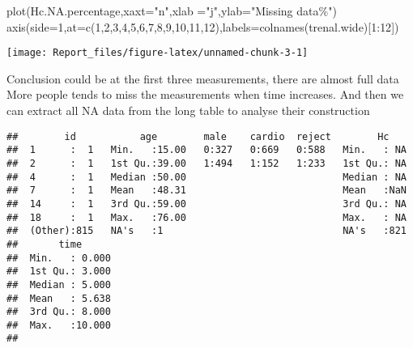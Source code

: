 \documentclass[
]{article}
\newenvironment{Shaded}{\begin{snugshade}}{\end{snugshade}}
\newcommand{\AttributeTok}[1]{\textcolor[rgb]{0.77,0.63,0.00}{#1}}
\newcommand{\CommentTok}[1]{\textcolor[rgb]{0.56,0.35,0.01}{\textit{#1}}}
\newcommand{\DecValTok}[1]{\textcolor[rgb]{0.00,0.00,0.81}{#1}}
\newcommand{\FunctionTok}[1]{\textcolor[rgb]{0.00,0.00,0.00}{#1}}
\newcommand{\NormalTok}[1]{#1}
\newcommand{\OtherTok}[1]{\textcolor[rgb]{0.56,0.35,0.01}{#1}}
\newcommand{\SpecialCharTok}[1]{\textcolor[rgb]{0.00,0.00,0.00}{#1}}
\newcommand{\StringTok}[1]{\textcolor[rgb]{0.31,0.60,0.02}{#1}}
\begin{document}
\begin{Shaded}
\begin{Highlighting}[]
\FunctionTok{plot}\NormalTok{(Hc.NA.percentage,}\AttributeTok{xaxt=}\StringTok{"n"}\NormalTok{,}\AttributeTok{xlab =}\StringTok{"j"}\NormalTok{,}\AttributeTok{ylab=}\StringTok{"Missing data\%"}\NormalTok{)}
\FunctionTok{axis}\NormalTok{(}\AttributeTok{side=}\DecValTok{1}\NormalTok{,}\AttributeTok{at=}\FunctionTok{c}\NormalTok{(}\DecValTok{1}\NormalTok{,}\DecValTok{2}\NormalTok{,}\DecValTok{3}\NormalTok{,}\DecValTok{4}\NormalTok{,}\DecValTok{5}\NormalTok{,}\DecValTok{6}\NormalTok{,}\DecValTok{7}\NormalTok{,}\DecValTok{8}\NormalTok{,}\DecValTok{9}\NormalTok{,}\DecValTok{10}\NormalTok{,}\DecValTok{11}\NormalTok{,}\DecValTok{12}\NormalTok{),}\AttributeTok{labels=}\FunctionTok{colnames}\NormalTok{(trenal.wide)[}\DecValTok{1}\SpecialCharTok{:}\DecValTok{12}\NormalTok{])}
\end{Highlighting}
\end{Shaded}

\begin{center}\texttt{[image: Report\_files/figure-latex/unnamed-chunk-3-1]} \end{center}

Conclusion could be at the first three measurements, there are almost
full data More people tends to miss the measurements when time
increases. And then we can extract all NA data from the long table to
analyse their construction

\begin{Shaded}
\end{Shaded}

\begin{verbatim}
##        id           age        male    cardio  reject        Hc     
##  1      :  1   Min.   :15.00   0:327   0:669   0:588   Min.   : NA  
##  2      :  1   1st Qu.:39.00   1:494   1:152   1:233   1st Qu.: NA  
##  4      :  1   Median :50.00                           Median : NA  
##  7      :  1   Mean   :48.31                           Mean   :NaN  
##  14     :  1   3rd Qu.:59.00                           3rd Qu.: NA  
##  18     :  1   Max.   :76.00                           Max.   : NA  
##  (Other):815   NA's   :1                               NA's   :821  
##       time       
##  Min.   : 0.000  
##  1st Qu.: 3.000  
##  Median : 5.000  
##  Mean   : 5.638  
##  3rd Qu.: 8.000  
##  Max.   :10.000  
## 
\end{verbatim}
\end{document}
